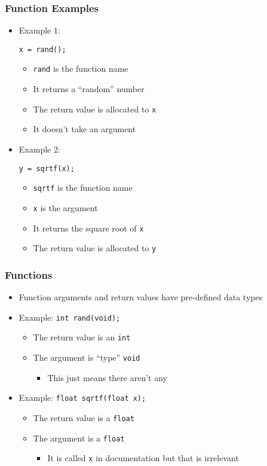 \documentclass[14pt]{beamer}
\begin{document}
\begin{frame}[fragile]
\frametitle{Function Examples}
\begin{itemize}
\item Example 1:
\begin{lstlisting}[style=CStyle]
x = rand();
\end{lstlisting}
	\begin{itemize}
		\item \texttt{rand} is the function name
		\item It returns a ``random'' number
		\item The return value is allocated to \texttt{x}
		\item It doesn't take an argument 	
	\end{itemize}
\pause
\item Example 2:
\begin{lstlisting}[style=CStyle]
y = sqrtf(x);
\end{lstlisting}
	\begin{itemize}
		\item \texttt{sqrtf} is the function name
		\item \texttt{x} is the argument
		\item It returns the square root of \texttt{x}
		\item The return value is allocated to \texttt{y}
	\end{itemize}
\end{itemize}
\end{frame}

\begin{frame}
\frametitle{Functions}
\begin{itemize}
\item Function arguments and return values have pre-defined data types
\pause
\item Example: \texttt{int rand(void);}
	\begin{itemize}
		\item The return value is an \texttt{int}
		\item The argument is ``type'' \texttt{void}
			\begin{itemize}
				\item This just means there aren't any
			\end{itemize}
	\end{itemize}
\pause
\item Example: \texttt{float sqrtf(float x);}
	\begin{itemize}
		\item The return value is a \texttt{float}
		\item The argument is a \texttt{float}
			\begin{itemize}
				\item It is called \texttt{x} in documentation but that is irrelevant
			\end{itemize}
	\end{itemize}
\end{itemize}
\end{frame}
\end{document}
